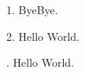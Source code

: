 \def\ta{Bye}
\def\tb{Bye}
1. \ta\tb.\par
\begingroup
\def\ta{Hello}
\def\tb{ World}
2. \ta\tb.\par
{}. \ta\tb.\par
\bye
